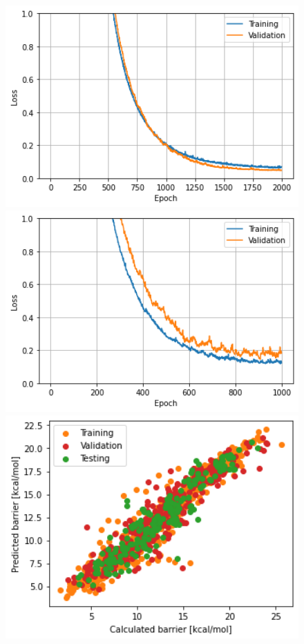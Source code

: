 \begin{figure}[!htb]
      \includegraphics[width=1.0\textwidth]{figures/regression/fourier/transfer/lossTransferAutocor.png}
    \endminipage\hfill
      \includegraphics[width=1.0\textwidth]{figures/regression/fourier/transfer/lossTransferFull.png}
    \endminipage\hfill
      \includegraphics[width=1.0\textwidth]{figures/regression/fourier/transfer/scatterTransferFull.png}

\end{figure}
